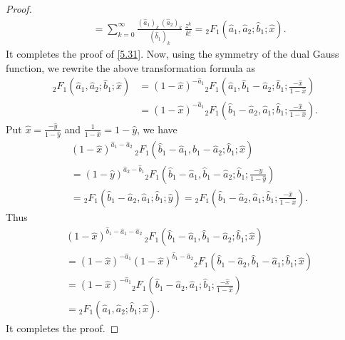 \documentclass[11pt,a4paper,fleqn]{article}
\numberwithin{equation}{section}
\numberwithin{lemma}{section}
\numberwithin{theorem}{section}
\numberwithin{corollary}{section}
\begin{document}
\begin{proof}
\begin{align}
	& = \sum_{k = 0}^{\infty} \frac{(\widehat{a}_1)_k \, (\widehat{a}_2)_k}{(\widehat{b}_1)_k} \, \frac{z^k}{k !} = {}_2F_1 (\widehat{a}_1, \widehat{a}_2; \widehat{b}_1; \widehat{x}).
\end{align} 
It completes the proof of \eqref{5.31}. Now, using the symmetry of the dual Gauss function, we rewrite the above transformation formula as
\begin{align}
	{}_2F_1 (\widehat{a}_1, \widehat{a}_2; \widehat{b}_1; \widehat{x}) & = (1 - \widehat{x})^{-\widehat{a}_1} {}_2F_1 \left(\widehat{a}_1, \widehat{b}_1 - \widehat{a}_2; \widehat{b}_1; \frac{-\widehat{x}}{1 - \widehat{x}}\right)\nonumber\\
	& = (1 - \widehat{x})^{-\widehat{a}_1} {}_2F_1 \left(\widehat{b}_1 - \widehat{a}_2, \widehat{a}_1; \widehat{b}_1; \frac{-\widehat{x}}{1 - \widehat{x}}\right).
\end{align}
Put $\widehat{x} = \frac{-\widehat{y}}{1 - \widehat{y}}$ and $\frac{1}{1 - \widehat{x}} = 1 - \widehat{y}$, we have 
\begin{align}
	&(1 - \widehat{x})^{\widehat{a}_1 - \widehat{a}_2}  \, {}_2F_1 (\widehat{b}_1 - \widehat{a}_1, \widehat{b}_1 - \widehat{a}_2; \widehat{b}_1; \widehat{x})\nonumber\\
	& = (1 - \widehat{y})^{\widehat{a}_2 - \widehat{b}_1} {}_2F_1 \left(\widehat{b}_1 - \widehat{a}_1, \widehat{b}_1 - \widehat{a}_2; \widehat{b}_1; \frac{-\widehat{y}}{1-\widehat{y}}\right)\nonumber\\
	& = {}_2F_1 (\widehat{b}_1 - \widehat{a}_2, \widehat{a}_1; \widehat{b}_1; \widehat{y}) = {}_2F_1 \left(\widehat{b}_1 - \widehat{a}_2, \widehat{a}_1; \widehat{b}_1; \frac{-\widehat{x}}{1 - \widehat{x}}\right).
\end{align}
Thus
\begin{align}
	&(1 - \widehat{x})^{\widehat{b}_1 - \widehat{a}_1 - \widehat{a}_2} \, {}_2F_1 (\widehat{b}_1 - \widehat{a}_1, \widehat{b}_1 - \widehat{a}_2; \widehat{b}_1; \widehat{x})\nonumber\\
	 &= (1 - \widehat{x})^{-\widehat{a}_1} (1 - \widehat{x})^{\widehat{b}_1 - \widehat{a}_2} {}_2F_1 (\widehat{b}_1 - \widehat{a}_2, \widehat{b}_1 - \widehat{a}_1; \widehat{b}_1; \widehat{x})\nonumber\\
	& = (1 - \widehat{x})^{-\widehat{a}_1} {}_2F_1 \left(\widehat{b}_1 - \widehat{a}_2, \widehat{a}_1; \widehat{b}_1; \frac{-\widehat{x}}{1 - \widehat{x}}\right) \nonumber\\
	& = {}_2F_1 (\widehat{a}_1, \widehat{a}_2; \widehat{b}_1; \widehat{x}).
\end{align}
It completes the proof.
\end{proof}
\end{document}
